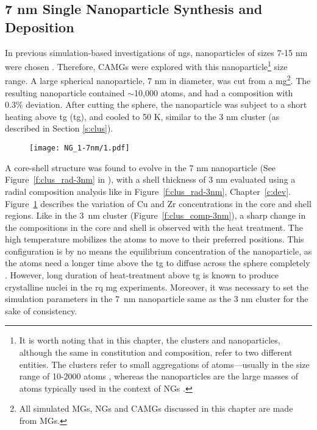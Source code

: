 \subsection{7 nm \cz Single Nanoparticle Synthesis and Deposition} 
In previous simulation-based investigations of \gls{ng}s, nanoparticles of sizes 7-15 nm were chosen  \cite{Adjaoud2016,Adjaoud2018,Kalcher2017,Cheng2019}. Therefore, CAMGs were explored with this nanoparticle\footnote{It is worth noting that in this chapter, the clusters and nanoparticles, although the same in constitution and composition, refer to two different entities. The clusters refer to small aggregations of atoms---usually in the size range of 10-2000 atoms \cite{Kartouzian2013,Kartouzian2014,Benel2018,Benel2019,Gack2020}, whereas the nanoparticles are the large masses of atoms typically used in the context of NGs \cite{Jing1989,Nandam2017,Adjaoud2016,Adjaoud2018}.} size range. A large spherical nanoparticle, 7 nm in diameter, was cut from a \cz {} \gls{mg}\footnote{All simulated MGs, NGs and CAMGs discussed in this chapter are made from \cz {} MGs.}. The resulting nanoparticle contained $\sim$10,000 atoms, and had a \cz composition with 0.3\% deviation. After cutting the sphere, the nanoparticle was subject to a short heating above \glsdesc{tg} (\gls{tg}), and cooled to 50 K, similar to the 3 nm cluster (as described in Section \ref{s:clus}). \par

\begin{figure}[!h] \centering
	\texttt{[image: NG\_1-7nm/1.pdf]}
	\label{f:7nm-clus}
\end{figure}

\clearpage

A core-shell structure was found to evolve in the 7 nm nanoparticle (See Figure~\ref{f:clus_rad-3nm} in ), with a shell thickness of 3 nm evaluated using a radial composition analysis like in Figure~\ref{f:clus_rad-3nm}, Chapter~\ref{c:dev}. Figure~\ref{f:7nm-clus} describes the variation of Cu and Zr concentrations in the core and shell regions. Like in the \mbox{3 nm} cluster (Figure~\ref{f:clus_comp-3nm}), a sharp change in the compositions in the core and shell is observed with the heat treatment. The high temperature mobilizes the atoms to move to their preferred positions. This configuration is by no means the equilibrium concentration of the nanoparticle, as the atoms need a longer time above the \gls{tg} to diffuse across the sphere completely \cite{Adjaoud2016}. However, long duration of heat-treatment above \gls{tg} is known to produce crystalline nuclei in the \gls{rq} \gls{mg} experiments. Moreover, it was necessary to set the simulation parameters in the \mbox{7 nm} nanoparticle same as the 3 nm cluster for the sake of consistency. \par


